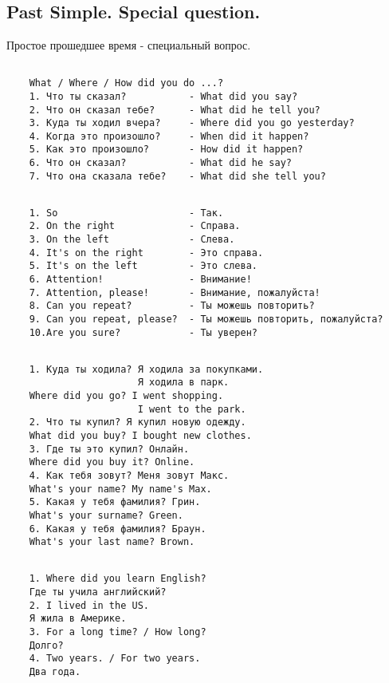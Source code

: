 \subsection{Past Simple. Special question.}
Простое прошедшее время - специальный вопрос.
\subsection*{}
\begin{verbatim}
    What / Where / How did you do ...?
    1. Что ты сказал?           - What did you say?
    2. Что он сказал тебе?      - What did he tell you?
    3. Куда ты ходил вчера?     - Where did you go yesterday?
    4. Когда это произошло?     - When did it happen?
    5. Как это произошло?       - How did it happen?
    6. Что он сказал?           - What did he say?
    7. Что она сказала тебе?    - What did she tell you?
\end{verbatim}

\subsection*{}
\begin{verbatim}
    1. So                       - Так.
    2. On the right             - Справа.
    3. On the left              - Слева.
    4. It's on the right        - Это справа.
    5. It's on the left         - Это слева.
    6. Attention!               - Внимание!
    7. Attention, please!       - Внимание, пожалуйста!
    8. Can you repeat?          - Ты можешь повторить?
    9. Can you repeat, please?  - Ты можешь повторить, пожалуйста?
    10.Are you sure?            - Ты уверен?
\end{verbatim}

\subsection*{}
\begin{verbatim}
    1. Куда ты ходила? Я ходила за покупками.
                       Я ходила в парк.
    Where did you go? I went shopping.
                       I went to the park.
    2. Что ты купил? Я купил новую одежду.
    What did you buy? I bought new clothes.
    3. Где ты это купил? Онлайн.
    Where did you buy it? Online.
    4. Как тебя зовут? Меня зовут Макс.
    What's your name? My name's Max.
    5. Какая у тебя фамилия? Грин.
    What's your surname? Green.
    6. Какая у тебя фамилия? Браун.
    What's your last name? Brown.
\end{verbatim}

\subsection*{}
\begin{verbatim}
    1. Where did you learn English?
    Где ты учила английский?
    2. I lived in the US.
    Я жила в Америке.
    3. For a long time? / How long?
    Долго?
    4. Two years. / For two years.
    Два года.
\end{verbatim}